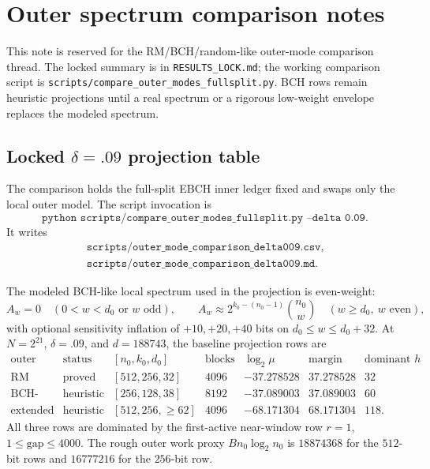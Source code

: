 \section{Outer spectrum comparison notes}
\label{sec:outer-spectrum-comparison-notes}

This note is reserved for the RM/BCH/random-like outer-mode comparison thread.  The locked summary is in
\texttt{RESULTS\_LOCK.md}; the working comparison script is
\texttt{scripts/compare\_outer\_modes\_fullsplit.py}.  BCH rows remain heuristic projections until a real spectrum or a
rigorous low-weight envelope replaces the modeled spectrum.

\subsection{Locked \(\delta=.09\) projection table}

The comparison holds the full-split EBCH inner ledger fixed and swaps only the local outer model.  The script invocation
is
\[
\texttt{python scripts/compare\_outer\_modes\_fullsplit.py --delta 0.09}.
\]
It writes
\[
\begin{gathered}
\texttt{scripts/outer\_mode\_comparison\_delta009.csv},\\
\texttt{scripts/outer\_mode\_comparison\_delta009.md}.
\end{gathered}
\]

The modeled BCH-like local spectrum used in the projection is even-weight:
\[
A_w=0\quad(0<w<d_0\text{ or }w\text{ odd}),\qquad
A_w\approx 2^{k_0-(n_0-1)}\binom{n_0}{w}\quad(w\ge d_0,\ w\text{ even}),
\]
with optional sensitivity inflation of \(+10,+20,+40\) bits on \(d_0\le w\le d_0+32\).  At \(N=2^{21}\),
\(\delta=.09\), and \(d=188743\), the baseline projection rows are
\[
\begin{array}{c|c|c|c|c|c|c}
\text{outer mode} & \text{status} & [n_0,k_0,d_0] & \text{blocks} &
\log_2\mu & \text{margin bits} & \text{dominant }h\\
\hline
\text{RM exact} & \text{proved} & [512,256,32] & 4096 & -37.278528 & 37.278528 & 32\\
\text{BCH-like} & \text{heuristic} & [256,128,38] & 8192 & -37.089003 & 37.089003 & 60\\
\text{extended BCH-like} & \text{heuristic} & [512,256,\ge62] & 4096 & -68.171304 & 68.171304 & 118 .
\end{array}
\]
All three rows are dominated by the first-active near-window row \(r=1\), \(1\le\mathrm{gap}\le4000\).  The rough outer
work proxy \(B n_0\log_2 n_0\) is \(18874368\) for the \(512\)-bit rows and \(16777216\) for the \(256\)-bit row.


